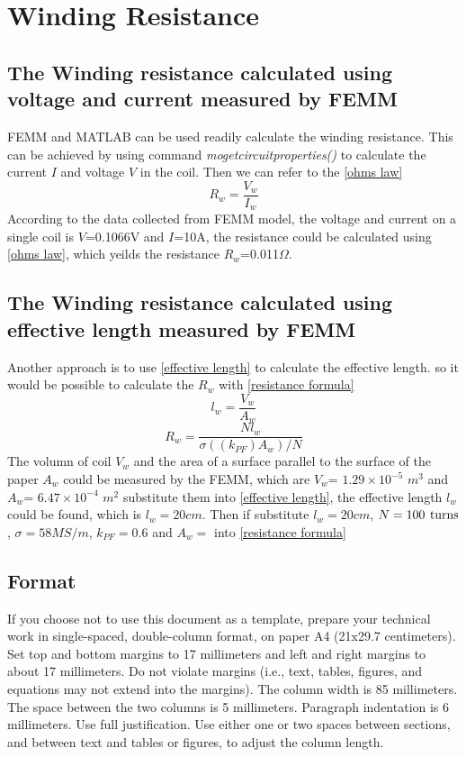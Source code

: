 \documentclass[a4paper]{IEEEtran}
\begin{document}
\section{Winding Resistance}
\subsection{The Winding resistance calculated using voltage and current measured by FEMM}                  
FEMM and MATLAB can be used readily calculate the winding resistance. 
This can be achieved by using command \textit{mo\textunderscore getcircuitproperties()} to calculate the current $I$ and voltage $V$ in the coil.
Then we can refer to the \eqref{ohms law}
\begin{equation}
R_w=\frac{V_w}{I_w} \label{ohms law}
\end{equation}
According to the data collected from FEMM model, the voltage and current on a single coil is $V$=0.1066V
and $I$=10A, the resistance could be calculated using \eqref{ohms law}, which yeilds the resistance $R_w$=0.011$\Omega$.
\subsection{The Winding resistance calculated using effective length measured by FEMM}
Another approach is to use \eqref{effective length} to calculate the effective length.
so it would be possible to calculate the $R_w$ with \eqref{resistance formula}
\begin{equation}%
l_w=\frac{V_w}{A_w} \label{effective length}
\end{equation}
\begin{equation}
R_w=\frac{Nl_w}{\sigma((k_{PF})A_w)/N} \label{resistance formula}
\end{equation}
The volumn of coil $V_w$ and the area of a surface parallel to the surface of the paper $A_w$ could be measured by
the FEMM, which are $V_w$= $1.29\times10^{-5}$ $m^3$ and $A_w$= $6.47\times10^{-4}$ $m^2$
substitute them into \eqref{effective length}, the effective length $l_w$ could be found, which is 
$l_w=20 cm$. Then if substitute $l_w=20 cm$, $N=100\hskip 0.4em \text{turns}$, $\sigma=58 MS/m$, $k_{PF}=0.6$ and $A_w=$ into \eqref{resistance formula}
\subsection{Format}
If you choose not to use this document as a template, prepare your technical work in single-spaced, double-column format, on paper A4 (21x29.7 centimeters). 
Set top and bottom margins to 17 millimeters and left and right margins to about 17 millimeters. Do not violate margins 
(i.e., text, tables, figures, and equations may not extend into the margins). 
The column width is 85 millimeters. The space between the two columns is 5 millimeters. Paragraph indentation is 6 millimeters. Use full justification. 
Use either one or two spaces between sections, and between text and tables or figures, to adjust the column length.
\end{document}
